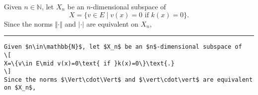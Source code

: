 \documentclass[12pt]{article}
\begin{document}
Given $n\in\mathbb{N}$, let $X_n$ be an $n$-dimensional subspace of
\[
X=\{v\in E\mid v(x)=0\text{ if }k(x)=0\}\text{.}
\]
Since
the norms $\Vert\cdot\Vert$ and $\vert\cdot\vert$ are equivalent on $X_n$,\\

\hrule

 \begin{verbatim}
Given $n\in\mathbb{N}$, let $X_n$ be an $n$-dimensional subspace of
\[
X=\{v\in E\mid v(x)=0\text{ if }k(x)=0\}\text{.}
\]
Since the norms $\Vert\cdot\Vert$ and $\vert\cdot\vert$ are equivalent on $X_n$,

\end{verbatim}
\end{document}

